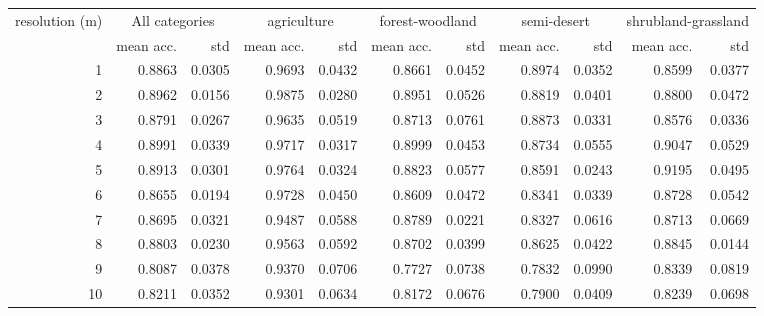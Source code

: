 \begin{tabular}{rrrrrrrrrrr}
\toprule
resolution (m) & \multicolumn{2}{c}{All categories} & \multicolumn{2}{c}{agriculture} & \multicolumn{2}{c}{forest-woodland} & \multicolumn{2}{c}{semi-desert} & \multicolumn{2}{c}{shrubland-grassland} \\
           &     mean acc. &    std &                 mean acc. &    std &                     mean acc. &    std &                 mean acc. &    std &                         mean acc. &    std \\
\midrule
         1 &   0.8863 & 0.0305 &               0.9693 & 0.0432 &                   0.8661 & 0.0452 &               0.8974 & 0.0352 &                       0.8599 & 0.0377 \\
         2 &   0.8962 & 0.0156 &               0.9875 & 0.0280 &                   0.8951 & 0.0526 &               0.8819 & 0.0401 &                       0.8800 & 0.0472 \\
         3 &   0.8791 & 0.0267 &               0.9635 & 0.0519 &                   0.8713 & 0.0761 &               0.8873 & 0.0331 &                       0.8576 & 0.0336 \\
         4 &   0.8991 & 0.0339 &               0.9717 & 0.0317 &                   0.8999 & 0.0453 &               0.8734 & 0.0555 &                       0.9047 & 0.0529 \\
         5 &   0.8913 & 0.0301 &               0.9764 & 0.0324 &                   0.8823 & 0.0577 &               0.8591 & 0.0243 &                       0.9195 & 0.0495 \\
         6 &   0.8655 & 0.0194 &               0.9728 & 0.0450 &                   0.8609 & 0.0472 &               0.8341 & 0.0339 &                       0.8728 & 0.0542 \\
         7 &   0.8695 & 0.0321 &               0.9487 & 0.0588 &                   0.8789 & 0.0221 &               0.8327 & 0.0616 &                       0.8713 & 0.0669 \\
         8 &   0.8803 & 0.0230 &               0.9563 & 0.0592 &                   0.8702 & 0.0399 &               0.8625 & 0.0422 &                       0.8845 & 0.0144 \\
         9 &   0.8087 & 0.0378 &               0.9370 & 0.0706 &                   0.7727 & 0.0738 &               0.7832 & 0.0990 &                       0.8339 & 0.0819 \\
        10 &   0.8211 & 0.0352 &               0.9301 & 0.0634 &                   0.8172 & 0.0676 &               0.7900 & 0.0409 &                       0.8239 & 0.0698 \\

\end{tabular}
